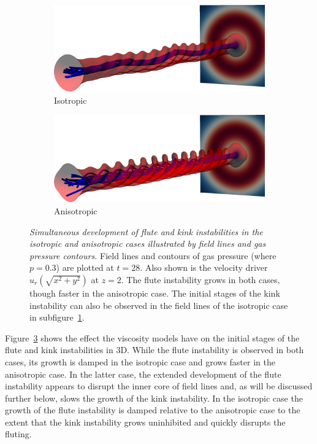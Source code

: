 \documentclass[fleqn,usenatbib]{mnras}
\newcommand{\rev}[1]{{\color{red} {#1}}}
\newcommand{\mycaption}[2]{\caption[#1]{\emph{#1} #2}}
\begin{document}
\begin{figure}
  \centering
    \begin{subfigure}{0.49\textwidth}
      \includegraphics[width=\linewidth]{field_line_plots/cropped/v-4r-4-isotropic_0014_cropped.png}
      \caption{Isotropic}
      \label{fig:field_line_plots_iso}
    \end{subfigure}
    \hfill
    \begin{subfigure}{0.49\textwidth}
      \includegraphics[width=\linewidth]{field_line_plots/cropped/v-4r-4-switching_0014_cropped.png}
      \caption{Anisotropic}
      \label{fig:field_line_plots_swi}
    \end{subfigure}
\mycaption{Simultaneous development of flute and kink instabilities in the
isotropic and anisotropic cases illustrated by field lines and
\rev{gas} pressure
contours.}{Field lines and contours of \rev{gas} pressure (where $p=0.3$) are plotted at
$t=28$. Also shown is the velocity driver $u_r(\sqrt{x^2+y^2})$ at $z=2$. The
flute instability grows in both cases, though faster in the anisotropic case.
The initial stages of the kink instability can also be observed in the field
lines of the isotropic case in subfigure~\ref{fig:field_line_plots_iso}.}
\label{fig:kink_field_line_plots}%
\end{figure}

Figure~\ref{fig:kink_field_line_plots} shows the effect the viscosity models
have on the initial stages of the flute and kink instabilities in 3D. While the
flute instability is observed in both cases, \rev{its growth is  damped} in the
isotropic case and grows faster in the anisotropic case. In the latter case,
the extended development of the flute instability appears to disrupt the inner
core of field lines and, as will be discussed further below, slows the growth
of the kink instability. In the isotropic case the \rev{growth of the flute
instability is damped relative to the anisotropic case} to the extent that the
kink instability grows uninhibited and quickly disrupts the fluting. 
\end{document}
